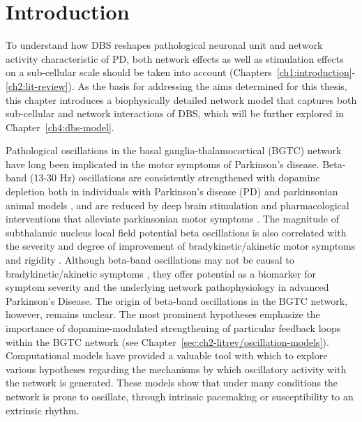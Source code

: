 
%
%
%

%
%
%
%
%

%

%

%
%
%
%
%

%
%

%
%
%
%

%
%

%
%
%
\section{Introduction}
\label{sec:ch3-introduction}

%
%
%

%
%

%
%
%

%

%
%
To understand how DBS reshapes pathological neuronal unit and network activity
characteristic of PD, both network effects as well as stimulation effects on a sub-cellular
scale should be taken into account (Chapters~\ref{ch1:introduction}-\ref{ch2:lit-review}).
As the basis for addressing the aims determined for this thesis, this chapter introduces a
biophysically detailed network model that captures both sub-cellular and network interactions
of DBS, which will be further explored in Chapter~\ref{ch4:dbs-model}.
%
%
%
%


%
%
Pathological oscillations in the basal ganglia-thalamocortical (BGTC) network have
long been implicated in the motor symptoms of Parkinson's disease. Beta-band (13-30 Hz)
oscillations are consistently strengthened with dopamine depletion both in individuals
with Parkinson's disease (PD) and parkinsonian animal models \cite{sharott_dopamine_2005,mallet_disrupted_2008,kuhn_high-frequency_2008},
and are reduced by deep brain stimulation and pharmacological interventions
that alleviate parkinsonian motor symptoms \cite{kuhn_reduction_2006,weinberger_beta_2006,eusebio_deep_2011,ray_local_2008}. The magnitude of subthalamic nucleus local field potential beta oscillations is also correlated with the severity and degree of improvement of bradykinetic/akinetic motor symptoms and rigidity \cite{kuhn_reduction_2006,bronte-stewart_stn_2009}. Although beta-band oscillations may not be causal to bradykinetic/akinetic symptoms \cite{leblois_late_2007}, they offer potential as a biomarker for symptom severity and the underlying network pathophysiology in advanced Parkinson's Disease.
%
%
%
%
%
%
%
%
%
%
%
%
%
%
%
%
%
%
%
The origin of beta-band oscillations in the BGTC network, however, remains unclear.
The most prominent hypotheses emphasize the importance of dopamine-modulated strengthening
of particular feedback loops within the BGTC network (see Chapter~\ref{sec:ch2-litrev/oscillation-models}).
Computational models have provided a valuable tool with which to explore various hypotheses
regarding the mechanisms by which oscillatory activity with the network is generated.
These models show that under many conditions the network is prone to oscillate,
through intrinsic pacemaking or susceptibility to an extrinsic rhythm.
%
%
%
%

